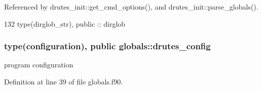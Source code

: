 Referenced by drutes\+\_\+init\+::get\+\_\+cmd\+\_\+options(), and drutes\+\_\+init\+::parse\+\_\+globals().


\begin{DoxyCode}
132   \textcolor{keywordtype}{type}(dirglob_str), \textcolor{keywordtype}{public} :: dirglob
\end{DoxyCode}
\subsubsection[{drutes\+\_\+config}]{\setlength{\rightskip}{0pt plus 5cm}type({\bf configuration}), public globals\+::drutes\+\_\+config}\label{namespaceglobals_a76491724ea1ced217a173cbc1d4443c7}


program configuration 



Definition at line 39 of file globals.\+f90.



